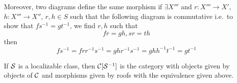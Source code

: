 \documentclass[etingof-dmod.tex]{subfiles}
\begin{document}
Moreover, two diagrams
define the same morphism if $\exists X'''$ and $r: X''' \rightarrow X'$, $h:
X''' \rightarrow X''$, $r,h \in S$ such that the following diagram is
commutative
i.e.\ to show that $f s^{-1} = gt^{-1}$, we find $r,h$ such that $$fr = gh, sr =
th$$ then $$fs^{-1} = f r r^{-1} s^{-1} = g h r^{-1} s^{-1} = g h h^{-1}
t^{-1} = g t ^{-1}$$

\begin{prop}
  If $\mathcal{S}$ is a localizable class, then $\mathcal{C}[\mathcal{S}^{-1}]$ is the category
  with objects given by objects of $\mathcal{C}$ and morphisms given by roofs with
  the equivalence given above.
\end{prop}
\end{document}
